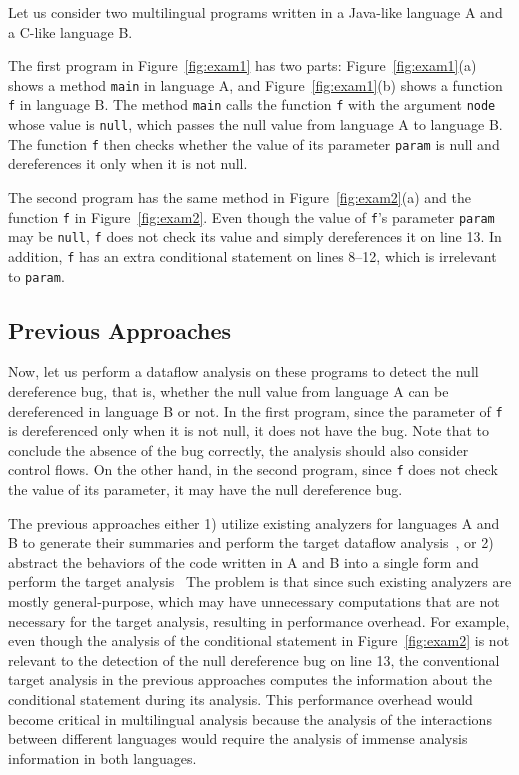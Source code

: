 Let us consider two multilingual programs written in a Java-like language A
and a C-like language B.

The first program in Figure~\ref{fig:exam1} has two parts:
Figure~\ref{fig:exam1}(a) shows a method \texttt{main} in language A,
and Figure~\ref{fig:exam1}(b) shows a function \texttt{f} in language B.
The method \texttt{main} calls the function \texttt{f} with the argument
\texttt{node} whose value is \texttt{null}, which passes the null
value from language A to language B. The function \texttt{f} then
checks whether the value of its parameter \texttt{param} is null
and dereferences it only when it is not null.

The second program has the same method in Figure~\ref{fig:exam2}(a)
and the function \texttt{f} in Figure~\ref{fig:exam2}.
Even though the value of \texttt{f}'s parameter \texttt{param} may be \texttt{null},
\texttt{f} does not check its value and simply dereferences it on line 13.
In addition, \texttt{f} has an extra conditional statement on lines 8--12,
which is irrelevant to \texttt{param}.

\subsection{Previous Approaches}
Now, let us perform a dataflow analysis on these programs to detect
the null dereference bug, that is, whether the null value from
language A can be dereferenced in language B or not.
In the first program, since the parameter of \texttt{f} is
dereferenced only when it is not null, it does not have the bug.
Note that to conclude the absence of the bug correctly,
the analysis should also consider control flows.
On the other hand, in the second program, since \texttt{f} does not
check the value of its parameter, it may have the null dereference bug.

The previous approaches either 1) utilize existing analyzers for
languages A and B to generate their summaries and perform the
target dataflow analysis~\cite{LeeASE20,JN-SAF}, or 2) abstract 
the behaviors of the code written in A and B into a single form and
perform the target analysis~\cite{HybriDroid,PyC}
The problem is that since such existing analyzers are mostly general-purpose,
which may have unnecessary computations that are not necessary for the target analysis,
resulting in performance overhead.
For example, even though the analysis of the conditional statement in Figure~\ref{fig:exam2}
is not relevant to the detection of the null dereference bug on line 13,
the conventional target analysis in the previous approaches computes
the information about the conditional statement during its analysis.
This performance overhead would become critical in multilingual analysis
because the analysis of the interactions between different languages would require
the analysis of immense analysis information in both languages.


